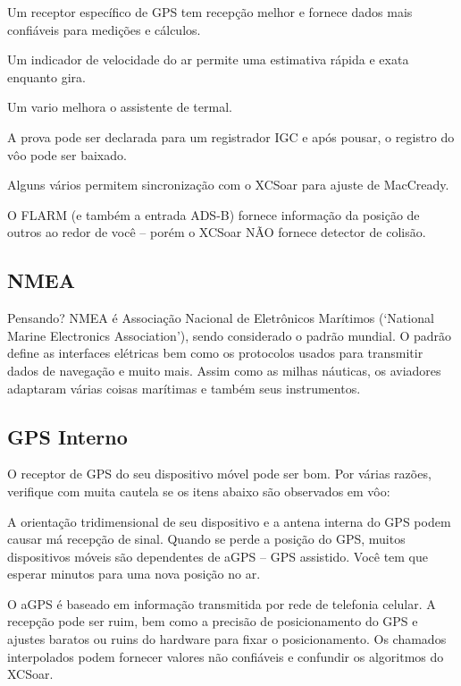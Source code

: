 \documentclass[a4paper,12pt,utf8]{scrreprt}
\begin{document}
\begin{compactitem}
\item Um receptor específico de GPS tem recepção melhor e fornece dados mais confiáveis para medições e cálculos.
\item Um indicador de velocidade do ar permite uma estimativa rápida e exata enquanto gira.
\item Um vario melhora o assistente de termal.
\item A prova pode ser declarada para um registrador IGC e após pousar, o registro do vôo pode ser baixado.
\item Alguns vários permitem sincronização com o XCSoar para ajuste de MacCready.
\item O FLARM (e também a entrada ADS-B) fornece informação da posição de outros ao redor de você – porém o XCSoar NÃO fornece detector de colisão.
\end{compactitem}

\subsection{\textcolor{flashblue}{NMEA}}
Pensando? NMEA é Associação Nacional de Eletrônicos Marítimos (‘National Marine Electronics Association’), sendo considerado o padrão mundial.  O padrão define as interfaces elétricas bem como os protocolos usados para transmitir dados de navegação e muito mais.  Assim como as milhas náuticas, os aviadores adaptaram várias coisas marítimas e também seus instrumentos.

\subsection{\textcolor{flashblue}{GPS Interno}}
O receptor de GPS do seu dispositivo móvel pode ser bom.  Por várias razões, verifique com muita cautela se os itens abaixo são observados em vôo:

\begin{compactitem}
\item A orientação tridimensional de seu dispositivo e a antena interna do GPS podem causar má recepção de sinal.  Quando se perde a posição do GPS, muitos dispositivos móveis são dependentes de aGPS – GPS assistido.  Você tem que esperar minutos para uma nova posição no ar.  
\item O aGPS é baseado em informação transmitida por rede de telefonia celular.  A recepção pode ser ruim, bem como a precisão de posicionamento do GPS e ajustes baratos ou ruins do hardware para fixar o posicionamento.  Os chamados interpolados podem fornecer valores não confiáveis e confundir os algoritmos do XCSoar.

\end{compactitem}
\end{document}

